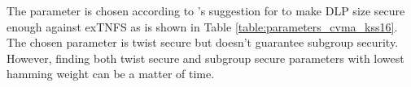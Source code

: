 The parameter is chosen according to \cite{EPRINT:BarDuq17}'s suggestion for to make DLP size secure enough against exTNFS \cite{C:KimBar16} as is shown in Table \ref{table:parameters_cvma_kss16}.
The  chosen parameter is twist secure but doesn't guarantee subgroup security.
However, finding both twist secure and subgroup secure parameters with lowest hamming weight can be a matter of time.
\renewcommand{\baselinestretch}{1.5}
\begin{table}[ht]
	\begin{center}		 
			\caption{Selected parameters for 128-bit security level according to  \cite{EPRINT:BarDuq17}.}
		\label{table:parameters_cvma_kss16}
	\end{center}
\end{table}
\renewcommand{\baselinestretch}{1.0}


